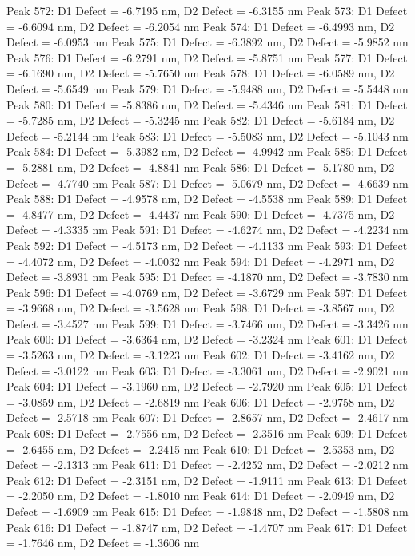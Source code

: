 \documentclass{article}
\begin{document}
Peak 572: D1 Defect = -6.7195 nm, D2 Defect = -6.3155 nm
Peak 573: D1 Defect = -6.6094 nm, D2 Defect = -6.2054 nm
Peak 574: D1 Defect = -6.4993 nm, D2 Defect = -6.0953 nm
Peak 575: D1 Defect = -6.3892 nm, D2 Defect = -5.9852 nm
Peak 576: D1 Defect = -6.2791 nm, D2 Defect = -5.8751 nm
Peak 577: D1 Defect = -6.1690 nm, D2 Defect = -5.7650 nm
Peak 578: D1 Defect = -6.0589 nm, D2 Defect = -5.6549 nm
Peak 579: D1 Defect = -5.9488 nm, D2 Defect = -5.5448 nm
Peak 580: D1 Defect = -5.8386 nm, D2 Defect = -5.4346 nm
Peak 581: D1 Defect = -5.7285 nm, D2 Defect = -5.3245 nm
Peak 582: D1 Defect = -5.6184 nm, D2 Defect = -5.2144 nm
Peak 583: D1 Defect = -5.5083 nm, D2 Defect = -5.1043 nm
Peak 584: D1 Defect = -5.3982 nm, D2 Defect = -4.9942 nm
Peak 585: D1 Defect = -5.2881 nm, D2 Defect = -4.8841 nm
Peak 586: D1 Defect = -5.1780 nm, D2 Defect = -4.7740 nm
Peak 587: D1 Defect = -5.0679 nm, D2 Defect = -4.6639 nm
Peak 588: D1 Defect = -4.9578 nm, D2 Defect = -4.5538 nm
Peak 589: D1 Defect = -4.8477 nm, D2 Defect = -4.4437 nm
Peak 590: D1 Defect = -4.7375 nm, D2 Defect = -4.3335 nm
Peak 591: D1 Defect = -4.6274 nm, D2 Defect = -4.2234 nm
Peak 592: D1 Defect = -4.5173 nm, D2 Defect = -4.1133 nm
Peak 593: D1 Defect = -4.4072 nm, D2 Defect = -4.0032 nm
Peak 594: D1 Defect = -4.2971 nm, D2 Defect = -3.8931 nm
Peak 595: D1 Defect = -4.1870 nm, D2 Defect = -3.7830 nm
Peak 596: D1 Defect = -4.0769 nm, D2 Defect = -3.6729 nm
Peak 597: D1 Defect = -3.9668 nm, D2 Defect = -3.5628 nm
Peak 598: D1 Defect = -3.8567 nm, D2 Defect = -3.4527 nm
Peak 599: D1 Defect = -3.7466 nm, D2 Defect = -3.3426 nm
Peak 600: D1 Defect = -3.6364 nm, D2 Defect = -3.2324 nm
Peak 601: D1 Defect = -3.5263 nm, D2 Defect = -3.1223 nm
Peak 602: D1 Defect = -3.4162 nm, D2 Defect = -3.0122 nm
Peak 603: D1 Defect = -3.3061 nm, D2 Defect = -2.9021 nm
Peak 604: D1 Defect = -3.1960 nm, D2 Defect = -2.7920 nm
Peak 605: D1 Defect = -3.0859 nm, D2 Defect = -2.6819 nm
Peak 606: D1 Defect = -2.9758 nm, D2 Defect = -2.5718 nm
Peak 607: D1 Defect = -2.8657 nm, D2 Defect = -2.4617 nm
Peak 608: D1 Defect = -2.7556 nm, D2 Defect = -2.3516 nm
Peak 609: D1 Defect = -2.6455 nm, D2 Defect = -2.2415 nm
Peak 610: D1 Defect = -2.5353 nm, D2 Defect = -2.1313 nm
Peak 611: D1 Defect = -2.4252 nm, D2 Defect = -2.0212 nm
Peak 612: D1 Defect = -2.3151 nm, D2 Defect = -1.9111 nm
Peak 613: D1 Defect = -2.2050 nm, D2 Defect = -1.8010 nm
Peak 614: D1 Defect = -2.0949 nm, D2 Defect = -1.6909 nm
Peak 615: D1 Defect = -1.9848 nm, D2 Defect = -1.5808 nm
Peak 616: D1 Defect = -1.8747 nm, D2 Defect = -1.4707 nm
Peak 617: D1 Defect = -1.7646 nm, D2 Defect = -1.3606 nm
\end{document}
